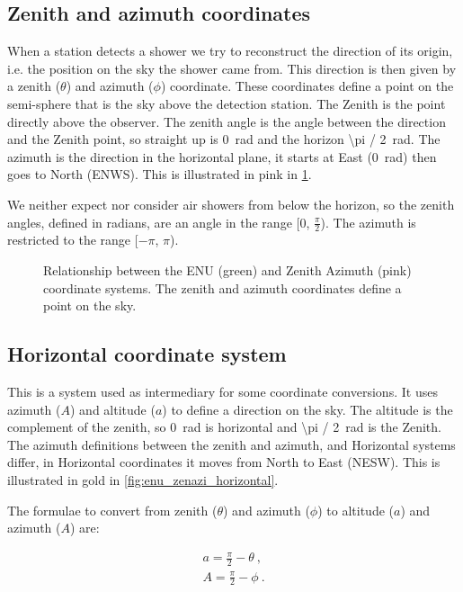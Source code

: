 \subsection{Zenith and azimuth coordinates}

When a station detects a shower we try to reconstruct the direction of
its origin, i.e. the position on the sky the shower came from. This
direction is then given by a zenith ($\theta$) and azimuth ($\phi$)
coordinate. These coordinates define a point on the semi-sphere that is
the sky above the detection station. The Zenith is the point directly
above the observer. The zenith angle is the angle between the direction
and the Zenith point, so straight up is \SI{0}{\radian} and the horizon
\SI{\pi / 2}{\radian}. The azimuth is the direction in the horizontal
plane, it starts at East (\SI{0}{\radian}) then goes to North (ENWS).
This is illustrated in pink in \cref{fig:enu_zenazi}.

We neither expect nor consider air showers from below the horizon, so the
zenith angles, defined in radians, are an angle in the range [0,
$\frac{\pi}{2}$). The azimuth is restricted to the range [$-\pi$, $\pi$).

\begin{figure}
    \centering
    
    \caption{Relationship between the ENU (green) and Zenith Azimuth (pink)
             coordinate systems. The zenith and azimuth coordinates define
             a point on the sky.}
    \label{fig:enu_zenazi}
\end{figure}


\subsection{Horizontal coordinate system}

This is a system used as intermediary for some coordinate conversions.
It uses azimuth ($A$) and altitude ($a$) to define a direction on the sky. The
altitude is the complement of the zenith, so \SI{0}{\radian} is horizontal
and \SI{\pi / 2}{\radian} is the Zenith. The azimuth definitions between the
zenith and azimuth, and Horizontal systems differ, in Horizontal
coordinates it moves from North to East (NESW). This is illustrated in
gold in \cref{fig:enu_zenazi_horizontal}.

The formulae to convert from zenith ($\theta$) and azimuth ($\phi$) to
altitude ($a$) and azimuth ($A$) are:

\begin{equation}
    \begin{array}{l}
        a = \frac{\pi}{2} - \theta \ , \\
        A = \frac{\pi}{2} - \phi \ .
    \end{array}
\end{equation}

